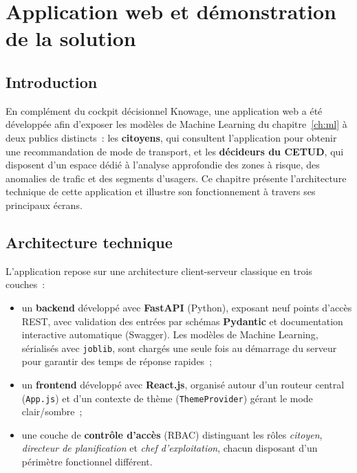 \chapter{Application web et démonstration de la solution}
\label{ch:demo}

\section{Introduction}
En complément du cockpit décisionnel Knowage, une application web a été développée afin d'exposer les modèles de Machine Learning du chapitre~\ref{ch:ml} à deux publics distincts~: les \textbf{citoyens}, qui consultent l'application pour obtenir une recommandation de mode de transport, et les \textbf{décideurs du CETUD}, qui disposent d'un espace dédié à l'analyse approfondie des zones à risque, des anomalies de trafic et des segments d'usagers. Ce chapitre présente l'architecture technique de cette application et illustre son fonctionnement à travers ses principaux écrans.

\section{Architecture technique}
L'application repose sur une architecture client-serveur classique en trois couches~:

\begin{itemize}
\item un \textbf{backend} développé avec \textbf{FastAPI} (Python), exposant neuf points d'accès REST, avec validation des entrées par schémas \textbf{Pydantic} et documentation interactive automatique (Swagger). Les modèles de Machine Learning, sérialisés avec \texttt{joblib}, sont chargés une seule fois au démarrage du serveur pour garantir des temps de réponse rapides~;
\item un \textbf{frontend} développé avec \textbf{React.js}, organisé autour d'un routeur central (\texttt{App.js}) et d'un contexte de thème (\texttt{ThemeProvider}) gérant le mode clair/sombre~;
\item une couche de \textbf{contrôle d'accès} (RBAC) distinguant les rôles \emph{citoyen}, \emph{directeur de planification} et \emph{chef d'exploitation}, chacun disposant d'un périmètre fonctionnel différent.
\end{itemize}


